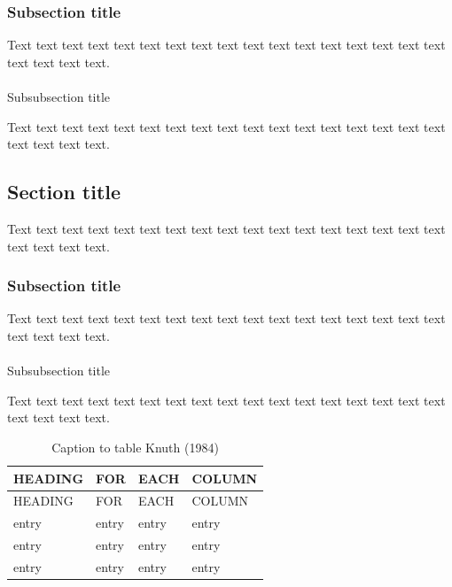 \documentclass[
]{iucrjournals}
\makeatletter
\let\oldparagraph\paragraph
\renewcommand{\paragraph}{
    \@ifstar
      \xxxParagraphStar
      \xxxParagraphNoStar
  }
\newcommand{\xxxParagraphStar}[1]{\oldparagraph*{#1}\mbox{}}
\newcommand{\xxxParagraphNoStar}[1]{\oldparagraph{#1}\mbox{}}
\makeatother
\begin{document}
\subsubsection{Subsection title}\label{subsection-title}

Text text text text text text text text text text text text text text
text text text text text text text.

\paragraph{Subsubsection title}\label{subsubsection-title}

Text text text text text text text text text text text text text text
text text text text text text text.

\subsection{Section title}\label{section-title-1}

Text text text text text text text text text text text text text text
text text text text text text text.

\subsubsection{Subsection title}\label{subsection-title-1}

Text text text text text text text text text text text text text text
text text text text text text text.

\paragraph{Subsubsection title}\label{subsubsection-title-1}

Text text text text text text text text text text text text text text
text text text text text text text.

\begin{longtable}[]{@{}llll@{}}
\caption{Caption to table Knuth (1984)}\tabularnewline
\toprule\noalign{}
HEADING & FOR & EACH & COLUMN \\
\midrule\noalign{}
\endfirsthead
\toprule\noalign{}
HEADING & FOR & EACH & COLUMN \\
\midrule\noalign{}
\endhead
\bottomrule\noalign{}
\endlastfoot
entry & entry & entry & entry \\
entry & entry & entry & entry \\
entry & entry & entry & entry \\
\end{longtable}
\end{document}

